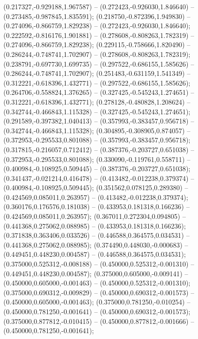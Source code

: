  (0.217327,-0.929188,1.967587) -- (0.272423,-0.926030,1.846640) -- (0.273485,-0.987845,1.835591);
 (0.218750,-0.872396,1.949830) -- (0.274096,-0.866759,1.829238) -- (0.272423,-0.926030,1.846640);
 (0.222592,-0.816176,1.901881) -- (0.278608,-0.808263,1.782319) -- (0.274096,-0.866759,1.829238);
 (0.229115,-0.758666,1.820490) -- (0.286244,-0.748741,1.702907) -- (0.278608,-0.808263,1.782319);
 (0.238791,-0.697730,1.699735) -- (0.297522,-0.686155,1.585626) -- (0.286244,-0.748741,1.702907);
 (0.251483,-0.631159,1.541349) -- (0.312221,-0.618396,1.432771) -- (0.297522,-0.686155,1.585626);
 (0.264706,-0.558824,1.376265) -- (0.327425,-0.545243,1.274651) -- (0.312221,-0.618396,1.432771);
 (0.278128,-0.480828,1.208624) -- (0.342744,-0.466843,1.115328) -- (0.327425,-0.545243,1.274651);
 (0.291589,-0.397382,1.040413) -- (0.357993,-0.383457,0.956718) -- (0.342744,-0.466843,1.115328);
 (0.304895,-0.308905,0.874057) -- (0.372953,-0.295533,0.801088) -- (0.357993,-0.383457,0.956718);
 (0.317815,-0.216057,0.712412) -- (0.387376,-0.203727,0.651038) -- (0.372953,-0.295533,0.801088);
 (0.330090,-0.119761,0.558711) -- (0.400984,-0.108925,0.509445) -- (0.387376,-0.203727,0.651038);
 (0.341437,-0.021214,0.416478) -- (0.413482,-0.012238,0.379374) -- (0.400984,-0.108925,0.509445);
 (0.351562,0.078125,0.289380) -- (0.424569,0.085011,0.263957) -- (0.413482,-0.012238,0.379374);
 (0.360176,0.176576,0.181038) -- (0.433953,0.181318,0.166236) -- (0.424569,0.085011,0.263957);
 (0.367011,0.272304,0.094805) -- (0.441368,0.275062,0.088985) -- (0.433953,0.181318,0.166236);
 (0.371838,0.363406,0.033526) -- (0.446588,0.364575,0.034531) -- (0.441368,0.275062,0.088985);
 (0.374490,0.448030,-0.000683) -- (0.449451,0.448230,0.004587) -- (0.446588,0.364575,0.034531);
 (0.375000,0.525312,-0.008188) -- (0.450000,0.525312,-0.001310) -- (0.449451,0.448230,0.004587);
 (0.375000,0.605000,-0.009141) -- (0.450000,0.605000,-0.001463) -- (0.450000,0.525312,-0.001310);
 (0.375000,0.690312,-0.009829) -- (0.450000,0.690312,-0.001573) -- (0.450000,0.605000,-0.001463);
 (0.375000,0.781250,-0.010254) -- (0.450000,0.781250,-0.001641) -- (0.450000,0.690312,-0.001573);
 (0.375000,0.877812,-0.010415) -- (0.450000,0.877812,-0.001666) -- (0.450000,0.781250,-0.001641);
